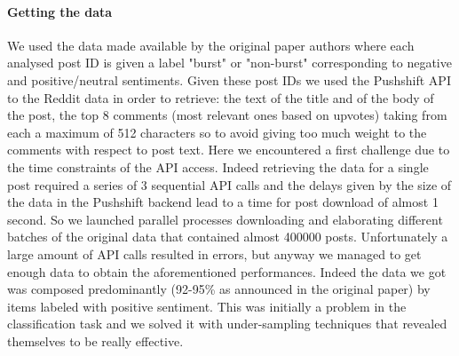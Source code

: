\documentclass[a4paper, 9pt]{article}
\begin{document}
\paragraph{Getting the data}
We used the data made available by the original paper authors where each analysed post ID is given a label 
"burst" or "non-burst" corresponding to negative and positive/neutral sentiments. Given these post IDs we 
used the Pushshift API to the Reddit data in order to retrieve: the text of the title and of the body 
of the post, the top 8 comments (most relevant ones based on upvotes) taking from each a maximum of 512
characters so to avoid giving too much weight to the comments with respect to post text.
Here we encountered a first challenge due to the time constraints of the API access. Indeed retrieving the
data for a single post required a series of 3 sequential API calls and the delays given by the size of
the data in the Pushshift backend lead to a time for post download of almost 1 second. So we launched
parallel processes downloading and elaborating different batches of the original data that contained almost 
400000 posts. Unfortunately a large amount of API calls resulted in errors, but anyway we managed to get
enough data to obtain the aforementioned performances.
Indeed the data we got was composed predominantly (92-95\% as announced in the original paper) by items
labeled with positive sentiment. This was initially a problem in the classification task and we solved it 
with under-sampling techniques that revealed themselves to be really effective. 
\end{document}
